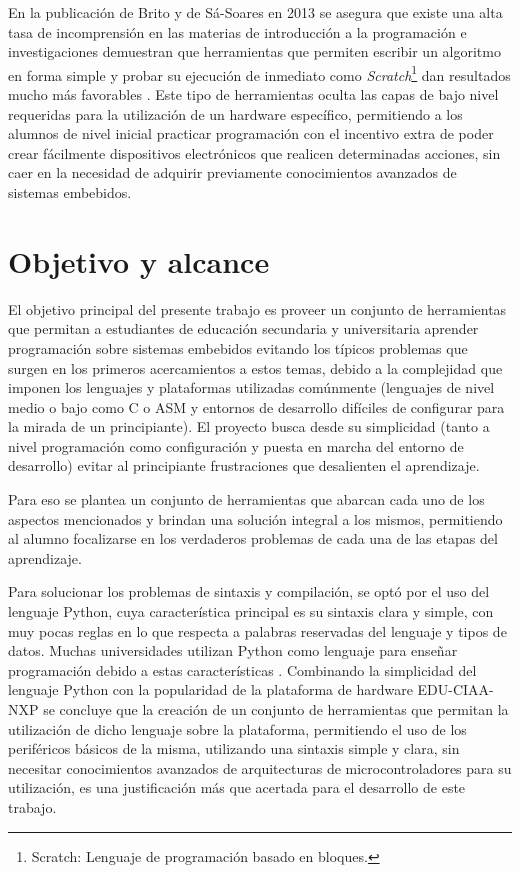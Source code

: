 En la publicación de Brito y de Sá-Soares en 2013 \cite{papereducacion3} se asegura que existe una alta tasa de incomprensión en las materias de introducción a la programación e investigaciones demuestran que herramientas que permiten escribir un algoritmo en forma simple y probar su ejecución de inmediato como \textit{Scratch}\footnote{Scratch: Lenguaje de programación basado en bloques.} dan resultados mucho más favorables \cite{papereducacion4}. Este tipo de herramientas oculta las capas de bajo nivel requeridas para la utilización de un hardware específico, permitiendo a los alumnos de nivel inicial practicar programación con el incentivo extra de poder crear fácilmente dispositivos electrónicos que realicen determinadas acciones, sin caer en la necesidad de adquirir previamente conocimientos avanzados de sistemas embebidos.


\section{Objetivo y alcance}

El objetivo principal del presente trabajo es proveer un conjunto de herramientas que permitan a estudiantes de educación secundaria y universitaria aprender programación sobre sistemas embebidos evitando los típicos problemas que surgen en los primeros acercamientos a estos temas, debido a la complejidad que imponen los lenguajes y plataformas utilizadas comúnmente (lenguajes de nivel medio o bajo como C o ASM y entornos de desarrollo difíciles de configurar para la mirada de un principiante).
El proyecto busca desde su simplicidad (tanto a nivel programación como configuración y puesta en marcha del entorno de desarrollo) evitar al principiante frustraciones que desalienten el aprendizaje.

Para eso se plantea un conjunto de herramientas que abarcan cada uno de los aspectos mencionados y brindan una solución integral a los mismos, permitiendo al alumno focalizarse en los verdaderos problemas de cada una de las etapas del aprendizaje.
 
Para solucionar los problemas de sintaxis y compilación, se optó por el uso del lenguaje Python, cuya característica principal es su sintaxis clara y simple, con muy pocas reglas en lo que respecta a palabras reservadas del lenguaje y tipos de datos. Muchas universidades utilizan Python como lenguaje para enseñar programación debido a estas características \cite{papereducacion}. Combinando la simplicidad del lenguaje Python con la popularidad de la plataforma de hardware EDU-CIAA-NXP se concluye que la creación de un conjunto de herramientas que permitan la utilización de dicho lenguaje sobre la plataforma, permitiendo el uso de los periféricos básicos de la misma, utilizando una sintaxis simple y clara, sin necesitar conocimientos avanzados de arquitecturas de microcontroladores para su utilización, es una justificación más que acertada para el desarrollo de este trabajo.

